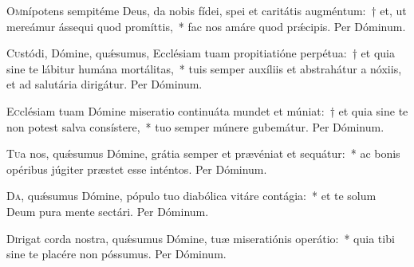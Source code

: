 \documentclass[vesperale_romanum.tex]{subfiles}
\begin{document}


\oratio

\lettrine{O}{m}nípotens sempitéme Deus, da nobis fídei, spei et caritátis augméntum:~† et, ut mereámur ássequi quod promíttis,~* fac nos amáre quod prǽcipis. Per Dóminum.



\oratio

\lettrine{C}{u}stódi, Dómine, quǽsumus, Ecclésiam tuam propitiatióne perpétua:~† et quia sine te lábitur humána mortálitas,~* tuis semper auxíliis et abstrahátur a nóxiis, et ad salutária dirigátur. Per Dóminum. 



\oratio

\lettrine{E}{c}clésiam tuam Dómine miseratio continuáta mundet et múniat:~† et quia sine te non potest salva consístere,~* tuo semper múnere gubemátur. Per Dóminum.



\oratio

\lettrine{T}{u}a nos, quǽsumus Dómine, grátia semper et prævéniat et sequátur:~* ac bonis opéribus júgiter præstet esse inténtos.
Per Dóminum.


\oratio

\lettrine{D}{a}, quǽsumus Dómine, pópulo tuo diabólica vitáre contágia:~* et te solum Deum pura mente sectári. Per Dóminum.



\oratio

\lettrine{D}{i}rigat corda nostra, quǽsumus Dómine, tuæ miseratiónis operátio:~* quia tibi sine te placére non póssumus. Per Dóminum.

\end{document}

